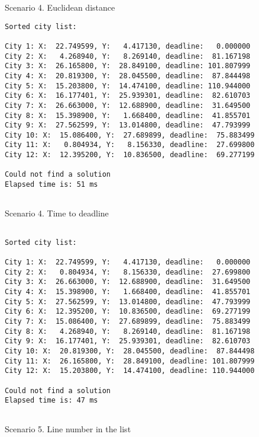 \documentclass[a4paper, 12pt]{article}
\begin{document}
Scenario 4. Euclidean distance

\begin{lstlisting}
Sorted city list:

City 1: X:  22.749599, Y:   4.417130, deadline:   0.000000
City 2: X:   4.268940, Y:   8.269140, deadline:  81.167198
City 3: X:  26.165800, Y:  28.849100, deadline: 101.807999
City 4: X:  20.819300, Y:  28.045500, deadline:  87.844498
City 5: X:  15.203800, Y:  14.474100, deadline: 110.944000
City 6: X:  16.177401, Y:  25.939301, deadline:  82.610703
City 7: X:  26.663000, Y:  12.688900, deadline:  31.649500
City 8: X:  15.398900, Y:   1.668400, deadline:  41.855701
City 9: X:  27.562599, Y:  13.014800, deadline:  47.793999
City 10: X:  15.086400, Y:  27.689899, deadline:  75.883499
City 11: X:   0.804934, Y:   8.156330, deadline:  27.699800
City 12: X:  12.395200, Y:  10.836500, deadline:  69.277199

Could not find a solution
Elapsed time is: 51 ms


\end{lstlisting}

Scenario 4. Time to deadline

\begin{lstlisting}

Sorted city list:

City 1: X:  22.749599, Y:   4.417130, deadline:   0.000000
City 2: X:   0.804934, Y:   8.156330, deadline:  27.699800
City 3: X:  26.663000, Y:  12.688900, deadline:  31.649500
City 4: X:  15.398900, Y:   1.668400, deadline:  41.855701
City 5: X:  27.562599, Y:  13.014800, deadline:  47.793999
City 6: X:  12.395200, Y:  10.836500, deadline:  69.277199
City 7: X:  15.086400, Y:  27.689899, deadline:  75.883499
City 8: X:   4.268940, Y:   8.269140, deadline:  81.167198
City 9: X:  16.177401, Y:  25.939301, deadline:  82.610703
City 10: X:  20.819300, Y:  28.045500, deadline:  87.844498
City 11: X:  26.165800, Y:  28.849100, deadline: 101.807999
City 12: X:  15.203800, Y:  14.474100, deadline: 110.944000

Could not find a solution
Elapsed time is: 47 ms


\end{lstlisting}

Scenario 5. Line number in the list
\end{document}
